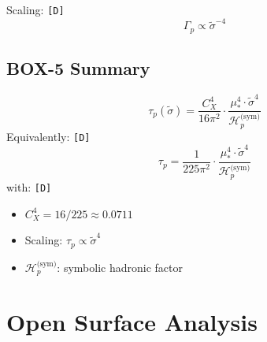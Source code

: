 \documentclass[11pt,a4paper]{article}
\newcommand{\tagD}{\textcolor{green!50!black}{\texttt{[D]}}}
\theoremstyle{definition}
\begin{document}
Scaling: \tagD{}
\begin{equation}
\label{eq:gamma-scaling}
\Gamma_p \propto \tilde{\sigma}^{-4}
\end{equation}

\subsection{BOX-5 Summary}
\label{subsec:box5-summary}

\begin{derivbox}
\begin{equation}
\label{eq:box5-canonical}
\boxed{\tau_p(\tilde{\sigma}) = \frac{C_X^4}{16\pi^2} \cdot \frac{\mu_*^4 \cdot \tilde{\sigma}^4}{\mathcal{H}_p^{\text{(sym)}}}}
\end{equation}
Equivalently: \tagD{}
\begin{equation}
\label{eq:box5-alt}
\tau_p = \frac{1}{225\pi^2} \cdot \frac{\mu_*^4 \cdot \tilde{\sigma}^4}{\mathcal{H}_p^{\text{(sym)}}}
\end{equation}
with: \tagD{}
\begin{itemize}
  \item $C_X^4 = 16/225 \approx 0.0711$
  \item Scaling: $\tau_p \propto \tilde{\sigma}^4$
  \item $\mathcal{H}_p^{\text{(sym)}}$: symbolic hadronic factor
\end{itemize}
\end{derivbox}

\section{Open Surface Analysis}
\label{sec:open-surface}
\end{document}
